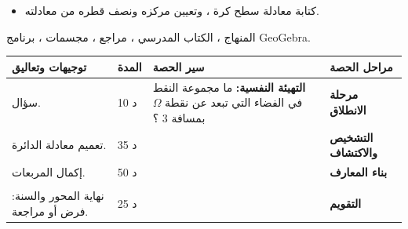 \documentclass[12pt,a4paper]{article}
\newenvironment{LTR}{\begin{otherlanguage}{english}}{\end{otherlanguage}}
\newcommand{\ar}[1]{\foreignlanguage{arabic}{#1}}
\newcommand{\Phase}[1]{\textbf{#1}}
\newenvironment{Sayr}{%
\begin{LTR}\renewcommand{\arraystretch}{1.25}
\begin{longtable}{|p{0.17\textwidth}|>{\centering\arraybackslash}p{0.06\textwidth}|p{0.53\textwidth}|>{\centering\arraybackslash}p{0.12\textwidth}|}
\hline\rowcolor{cThm!12}\ar{\textbf{توجيهات وتعاليق}} & \ar{\textbf{المدة}} & \ar{\textbf{سير الحصة}} & \ar{\textbf{مراحل الحصة}}\\\hline\endhead
\hline\endfoot}{\end{longtable}\end{LTR}}
\newcommand{\Row}[4]{\ar{\small #4} & \ar{#3} & \ar{#2} & \cellcolor{cThm!8}\ar{\Phase{#1}}\\\hline}
\newcommand{\Lab}[2]{\foreignlanguage{english}{\tcbox[on line,colback=#1,colframe=#1,boxrule=0pt,arc=2pt,boxsep=1pt,left=5pt,right=5pt,top=1pt,bottom=1pt]{\ar{\textcolor{white}{\textbf{#2}}}}}}
\newcommand{\ck}{\ensuremath{{\color{cRem}\checkmark}}}
\begin{document}
{\begin{itemize}\item كتابة معادلة سطح كرة ، وتعيين مركزه ونصف قطره من معادلته.\end{itemize}}%
{المنهاج ، الكتاب المدرسي ، مراجع ، مجسمات ، برنامج GeoGebra.}
\begin{Sayr}
\Row{مرحلة الانطلاق}{%
\textbf{التهيئة النفسية:} ما مجموعة النقط في الفضاء التي تبعد عن نقطة $\Omega$ بمسافة $3$ ؟}{10 د}{سؤال.}
\Row{التشخيص والاكتشاف}{%
\Lab{cEx}{وضعية مقترحة}\ سطح الكرة التي مركزها $\Omega(1;-2;0)$ ويشمل $A(3;-1;2)$.\par\ck\ $r=\Omega A=\sqrt{4+1+4}=3$ ؛ $M$ عليه يعني $\Omega M^2=9$: $(x-1)^2+(y+2)^2+z^2=9$.\par
}{35 د}{تعميم معادلة الدائرة.}
\Row{بناء المعارف}{%
\Lab{cThm}{خاصية}\ سطح الكرة الذي مركزه $\Omega(a;b;c)$ ونصف قطره $r$: $(x-a)^2+(y-b)^2+(z-c)^2=r^2$.\par\Lab{cEx}{مثال}\ $x^2+y^2+z^2-2x+4y-6z+5=0$ يكافئ $(x-1)^2+(y+2)^2+(z-3)^2=9$: سطح كرة مركزه $(1;-2;3)$ ونصف قطره $3$.\par}{50 د}{إكمال المربعات.}
\Row{}{%
\Lab{cRem}{ملاحظات}\ شعبة رياضيات وتقني رياضي: الأسطوانة الدورانية $x^2+y^2=r^2$ والمخروط الدوراني $x^2+y^2=kz^2$ (محورهما $(Oz)$).\par\Lab{cThm!80!black}{حذار}\ إذا كان الطرف الأيمن سالباً بعد الإكمال فالمجموعة خالية.}{}{}
\Row{التقويم}{%
\Lab{cEx}{تطبيق}\par $(S)$ سطح الكرة الذي مركزه $O$ ونصف قطره $3$. هل $A(1;2;2)$ تنتمي إلى $(S)$ ؟ عيّن تقاطع $(S)$ مع محور الرواقم.\par\textbf{الحل:} $1+4+4=9$: نعم ؛ $x=y=0$: $z^2=9$ ، النقطتان $(0;0;3)$ و $(0;0;-3)$.\par\textbf{واجب منزلي:} تمارين من باب التعليم في الفضاء.\par\smallskip\textbf{ملاحظات حول سير الحصة:} \dotfill}{25 د}{نهاية المحور والسنة: فرض أو مراجعة.}
\end{Sayr}
\end{document}
